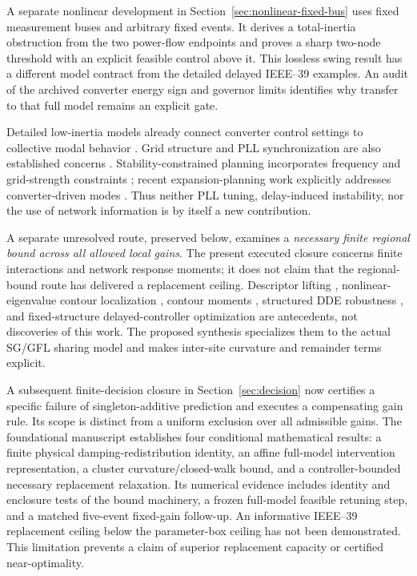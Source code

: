 \documentclass[11pt]{article}
\begin{document}
A separate nonlinear development in Section~\ref{sec:nonlinear-fixed-bus}
uses fixed measurement buses and arbitrary fixed events. It derives a
total-inertia obstruction from the two power-flow endpoints and proves a
sharp two-node threshold with an explicit feasible control above it.
This lossless swing result has a different model contract from the
detailed delayed IEEE--39 examples. An audit of the archived converter
energy sign and governor limits identifies why transfer to that full
model remains an explicit gate.


Detailed low-inertia models already connect converter control settings
to collective modal behavior \cite{markovic}. Grid structure and PLL
synchronization are also established concerns \cite{huang}.
Stability-constrained planning incorporates frequency and grid-strength
constraints \cite{chuteng}; recent expansion-planning work explicitly
addresses converter-driven modes \cite{jia}. Thus neither PLL tuning,
delay-induced instability, nor the use of network information is by
itself a new contribution.

A separate unresolved route, preserved below, examines a \emph{necessary
finite regional bound across all allowed local gains}. The present executed
closure concerns finite interactions and network response moments; it does
not claim that the regional-bound route has delivered a replacement ceiling.
Descriptor lifting \cite{peaucelle}, nonlinear-eigenvalue contour
localization \cite{bindel}, contour moments \cite{beyn}, structured
DDE robustness \cite{borgioli}, and fixed-structure delayed-controller
optimization \cite{michielsdesign} are antecedents, not discoveries
of this work. The proposed synthesis specializes them to the actual
SG/GFL sharing model and makes inter-site curvature and remainder
terms explicit.

A subsequent finite-decision closure in Section~\ref{sec:decision} now certifies a specific failure of singleton-additive prediction and executes a compensating gain rule. Its scope is distinct from a uniform exclusion over all admissible gains. The foundational manuscript establishes four conditional mathematical results:
a finite physical damping-redistribution identity, an affine full-model
intervention representation, a cluster curvature/closed-walk bound,
and a controller-bounded necessary replacement relaxation. Its numerical evidence includes identity and enclosure tests of the
bound machinery, a frozen full-model feasible retuning step, and a
matched five-event fixed-gain follow-up. An informative
IEEE--39 replacement ceiling below the parameter-box ceiling has not
been demonstrated. This limitation prevents a claim of superior
replacement capacity or certified near-optimality.
\end{document}
